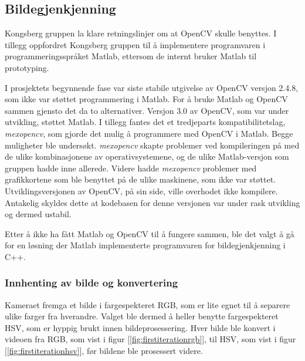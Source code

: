 \subsection{Bildegjenkjenning}

Kongsberg gruppen la klare retningslinjer om at OpenCV skulle benyttes. I tillegg oppfordret Kongsberg gruppen til å implementere programvaren i programmeringsspråket Matlab, ettersom de internt bruker Matlab til prototyping. 

I prosjektets begynnende fase var siste stabile utgivelse av OpenCV versjon 2.4.8, som ikke var støttet programmering i Matlab. For å bruke Matlab og OpenCV sammen gjensto det da to alternativer. Versjon 3.0 av OpenCV, som var under utvikling, støttet Matlab. I tillegg fantes det et tredjeparts kompatibilitetslag, \emph{mexopencv}, som gjorde det mulig å programmere med OpenCV i Matlab. Begge muligheter ble undersøkt. \emph{mexopencv} skapte problemer ved kompileringen på med de ulike kombinasjonene av operativsystemene, og de ulike Matlab-versjon som gruppen hadde inne allerede. Videre hadde \emph{mexopencv} problemer med grafikkortene som ble benyttet på de ulike maskinene, som ikke var støttet. Utviklingsversjonen av OpenCV, på sin side, ville overhodet ikke kompilere. Antakelig skyldes dette at kodebasen for denne versjonen var under rask utvikling og dermed ustabil.

Etter å ikke ha fått Matlab og OpenCV til å fungere sammen, ble det valgt å gå for en løsning der Matlab implementerte programvaren for bildegjenkjenning i C++. 
\subsubsection{Innhenting av bilde og konvertering}

Kameraet fremga et bilde i fargespekteret RGB, som er lite egnet til å separere ulike farger fra hverandre. Valget ble dermed å heller benytte fargespekteret HSV, som er hyppig brukt innen bildeprosessering. Hver bilde ble konvert i videoen fra RGB, som vist i figur [\ref{fig:firstiterationrgb}], til HSV, som vist i figur [\ref{fig:firstiterationhsv}], før bildene ble prosessert videre.

